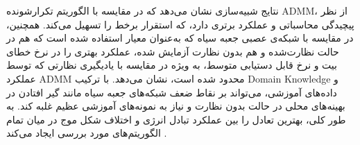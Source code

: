 نتایج شبیه‌سازی نشان می‌دهد که 
 در مقایسه با الگوریتم تکرارشونده 
\gls{ADMM}،
  از نظر پیچیدگی محاسباتی و عملکرد برتری دارد، که استقرار برخط را تسهیل می‌کند. همچنین، در مقایسه با شبکه‌ی عصبی جعبه سیاه که به‌عنوان معیار استفاده شده است که هم در حالت نظارت‌شده و هم بدون نظارت آزمایش شده،
 عملکرد بهتری را در نرخ خطای بیت و نرخ قابل دستیابی متوسط، به ویژه در مقایسه با یادیگیری نظارتی که توسط عملکرد 
\gls{ADMM}
  محدود شده است، نشان می‌دهد.
 با ترکیب 
\gls{Domain Knowledge}
 و داده‌های آموزشی، می‌تواند بر نقاط ضعف شبکه‌های جعبه سیاه مانند گیر افتادن در بهینه‌های محلی در حالت بدون نظارت و نیاز به نمونه‌های آموزشی عظیم غلبه کند. به طور کلی،
  بهترین تعادل را بین عملکرد تبادل 
   انرژی و اختلاف شکل موج در میان تمام الگوریتم‌های مورد بررسی ایجاد می‌کند
\cite{JointDesign}.
\begin{comment}
	

\end{comment}
